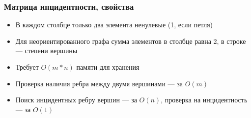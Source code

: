 \documentclass{../../slides-style}
\begin{document}
    \begin{frame}
        \frametitle{Матрица инцидентности, свойства}
        \begin{itemize}
            \item В каждом столбце только два элемента ненулевые (1, если петля)
            \item Для неориентированного графа сумма элементов в столбце равна 2, в строке --- степени вершины
            \item Требует $O(m * n)$ памяти для хранения
            \item Проверка наличия ребра между двумя вершинами --- за $O(m)$
            \item Поиск инцидентных ребру вершин --- за $O(n)$, проверка на инцидентность --- за $O(1)$
        \end{itemize}
    \end{frame}
\end{document}
